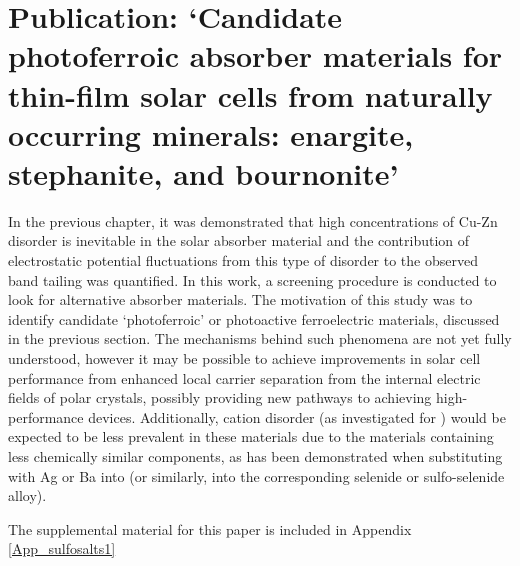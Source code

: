 \documentclass[11pt, twoside]{report}
\begin{document}
\section{Publication: `Candidate photoferroic absorber materials for thin-film
solar cells from naturally occurring minerals:
enargite, stephanite, and bournonite'}\label{sulfosalts1}


In the previous chapter, it was demonstrated that high concentrations of Cu-Zn disorder is inevitable in the solar absorber material {\CZTS} and the contribution of electrostatic potential fluctuations from this type of disorder to the observed band tailing was quantified. In this work, a screening procedure is conducted to look for alternative absorber materials. The motivation of this study was to identify candidate `photoferroic' or photoactive ferroelectric materials, discussed in the previous section. The mechanisms behind such phenomena are not yet fully understood, however it may be possible to achieve improvements in solar cell performance from enhanced local carrier separation from the internal electric fields of polar crystals, possibly providing new pathways to achieving high-performance devices.
Additionally, cation disorder (as investigated for {\CZTS}) would be expected to be less prevalent in these materials due to the materials containing less chemically similar components, as has been demonstrated when substituting with Ag \cite{Gerschon_AZTSe} or Ba \cite{distant_cations, Tong_Ba-CZTS} into {\CZTS} (or similarly, into the corresponding selenide or sulfo-selenide alloy).

The supplemental material for this paper is included in Appendix \ref{App_sulfosalts1}



\end{document}
